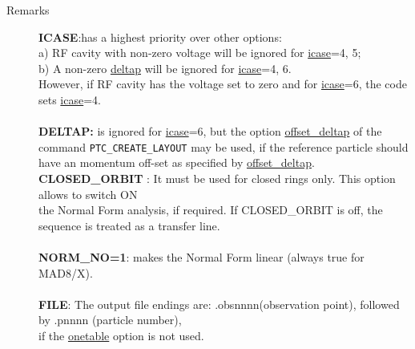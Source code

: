 \begin{description}
	\item[Remarks] \textbf{ICASE}:has a highest 
       priority over other options: 
\\
  a) RF cavity with non-zero voltage will be ignored for
       \hyperlink{ICASE}{icase}=4, 5;
\\
  b) A non-zero \hyperlink{DELTAP}{deltap} will be ignored 
       for \hyperlink{ICASE}{icase}=4, 6.
\\
       However, if RF cavity has the voltage set to zero and 
       for \hyperlink{ICASE}{icase}=6, the code sets
       \hyperlink{ICASE}{icase}=4.
\\
\\\textbf{DELTAP: }is 
       ignored for \hyperlink{ICASE}{icase}=6, but the option
       \href{../ptc_general/ptc_general.html}{offset\_deltap} of the command
       \texttt{PTC\_CREATE\_LAYOUT} may 
       be used, if 
       the reference particle should 
       have an momentum off-set as specified by
       \href{../ptc_general/ptc_general.html}{offset\_deltap}.
\\\textbf{CLOSED\_ORBIT} : It must 
       be used for closed rings only. This option allows to 
       switch ON 
\\
       the Normal Form analysis, if required. If CLOSED\_ORBIT is off, the sequence is 
     treated as a transfer line.
\\
\\\textbf{NORM\_NO=1}: makes the 
       Normal Form linear (always true for MAD8/X).
\\
\\\textbf{FILE}: The output file endings are:
       .obsnnnn(observation 
     point), followed by .pnnnn 
     (particle number), 
\\
       if the \hyperlink{ONETABLE}{onetable} option is not 
       used.
\end{description}
